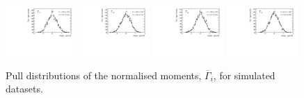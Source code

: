 \begin{figure}
\includegraphics[width=0.24\textwidth]{figs/kpimm/angular-analysis/toys/pull_m_18.pdf}
\includegraphics[width=0.24\textwidth]{figs/kpimm/angular-analysis/toys/pull_m_19.pdf}
\includegraphics[width=0.24\textwidth]{figs/kpimm/angular-analysis/toys/pull_m_20.pdf}
\includegraphics[width=0.24\textwidth]{figs/kpimm/angular-analysis/toys/pull_m_21.pdf}
\caption{Pull distributions of the normalised moments, $\overline{\Gamma}_{i}$, for simulated datasets.}
\label{fig:appendix:kpimm:angular-analysis:toys:pulls:1}
\end{figure}

